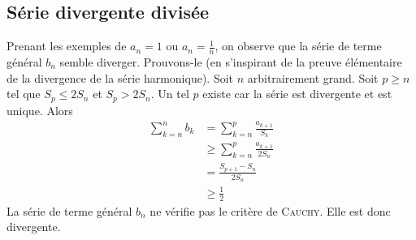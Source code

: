\subsection{Série divergente divisée}

Prenant les exemples de $a_n=1$ ou $a_n=\frac{1}{n}$, on observe que la série de terme général $b_n$ semble diverger. Prouvons-le (en s'inspirant de la preuve élémentaire de la divergence de la série harmonique). Soit $n$ arbitrairement grand. Soit $p\geqslant n$ tel que $S_p\leqslant 2S_n$ et $S_p>2S_n$. Un tel $p$ existe car la série est divergente et est unique. Alors
\[
    \begin{aligned}
        \sum_{k=n}^n b_k&=\sum_{k=n}^p\frac{a_{k+1}}{S_k}\\
        &\geqslant \sum_{k=n}^p \frac{a_{k+1}}{2S_n}\\
        &=\frac{S_{p+1}-S_n}{2S_n}\\
        &\geqslant
\frac{1}{2}
    \end{aligned}
\]
La série de terme général $b_n$ ne vérifie pas le critère de \textsc{Cauchy}. Elle est donc divergente.

